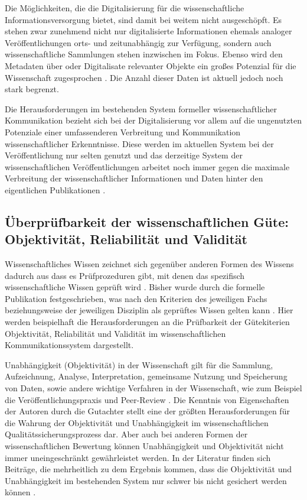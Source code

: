 Die Möglichkeiten, die die Digitalisierung für die wissenschaftliche Informationsversorgung bietet, sind damit bei weitem nicht ausgeschöpft. Es stehen zwar zunehmend nicht nur digitalisierte Informationen ehemals analoger Veröffentlichungen orts- und zeitunabhängig zur Verfügung, sondern auch wissenschaftliche Sammlungen stehen inzwischen im Fokus. Ebenso wird den Metadaten über oder Digitalisate relevanter Objekte ein großes Potenzial für die Wissenschaft zugesprochen \cite{winkler_2011_anforderungen}. Die Anzahl dieser Daten ist aktuell jedoch noch stark begrenzt.

Die Herausforderungen im bestehenden System formeller wissenschaftlicher Kommunikation bezieht sich bei der Digitalisierung vor allem auf die ungenutzten Potenziale einer umfassenderen Verbreitung und Kommunikation wissenschaftlicher Erkenntnisse. Diese werden im aktuellen System bei der Veröffentlichung nur selten genutzt und das derzeitige System der wissenschaftlichen Veröffentlichungen arbeitet noch immer gegen die maximale Verbreitung der wissenschaftlicher Informationen und Daten hinter den eigentlichen Publikationen \cite{Molloy_2011}.

\subsection{Überprüfbarkeit der wissenschaftlichen Güte: Objektivität, Reliabilität und Validität}

Wissenschaftliches Wissen zeichnet sich gegenüber anderen Formen des Wissens dadurch aus dass es Prüfprozeduren gibt, mit denen das spezifisch wissenschaftliche Wissen geprüft wird \cite{Luhmann1998}. Bisher wurde durch die formelle Publikation festgeschrieben, was nach den Kriterien des jeweiligen Fachs beziehungsweise der jeweiligen Disziplin als geprüftes Wissen gelten kann \cite[:11]{bbaw_publizieren_2015}. Hier werden beispielhaft die Herausforderungen an die Prüfbarkeit der Gütekiterien Objektivität, Reliabilität und Validität im wissenschaftlichen  Kommunikationssystem dargestellt.

Unabhängigkeit (Objektivität) in der Wissenschaft gilt für die Sammlung, Aufzeichnung, Analyse, Interpretation, gemeinsame Nutzung und Speicherung von Daten, sowie andere wichtige Verfahren in der Wissenschaft, wie zum Beispiel die Veröffentlichungspraxis und Peer-Review \cite{resnik_2005_ethics}. Die Kenntnis von Eigenschaften der Autoren durch die Gutachter stellt eine der größten Herausforderungen für die Wahrung der Objektivität und Unabhängigkeit im wissenschaftlichen Qualitätssicherungsprozess dar. Aber auch bei anderen Formen der wissenschaftlichen Bewertung können Unabhängigkeit und Objektivität nicht immer uneingeschränkt gewährleistet werden. In der Literatur finden sich Beiträge, die mehrheitlich zu dem Ergebnis kommen, dass die Objektivität und Unabhängigkeit im bestehenden System nur schwer bis nicht gesichert werden können \cite{binswanger_2014_excellence}.

